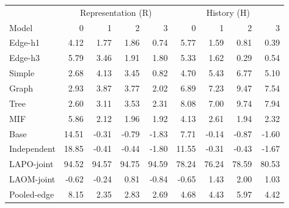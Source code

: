 \begin{tablehere}
\centering\small
\setlength{\tabcolsep}{4pt}
\caption{Observed per-agent motion readout in MPE. Skill (\%) is mean over five seeds. Columns retain each partner/agent separately; R is transition-informed representation, H is causal history. No Base concatenation.}
\label{tab:observed_changempe}
\begin{tabular}{lrrrrrrrr}\toprule
 & \multicolumn{4}{c}{Representation (R)} & \multicolumn{4}{c}{History (H)} \\
Model & 0 & 1 & 2 & 3 & 0 & 1 & 2 & 3\\\midrule
Edge-h1 & 4.12 & 1.77 & 1.86 & 0.74 & 5.77 & 1.59 & 0.81 & 0.39\\
Edge-h3 & 5.79 & 3.46 & 1.91 & 1.80 & 5.33 & 1.62 & 0.29 & 0.54\\
Simple & 2.68 & 4.13 & 3.45 & 0.82 & 4.70 & 5.43 & 6.77 & 5.10\\
Graph & 2.93 & 3.87 & 3.77 & 2.02 & 6.89 & 7.23 & 9.47 & 7.54\\
Tree & 2.60 & 3.11 & 3.53 & 2.31 & 8.08 & 7.00 & 9.74 & 7.94\\
MIF & 5.86 & 2.12 & 1.96 & 1.92 & 4.13 & 2.61 & 1.94 & 2.32\\
Base & 14.51 & -0.31 & -0.79 & -1.83 & 7.71 & -0.14 & -0.87 & -1.60\\
Independent & 18.85 & -0.41 & -0.44 & -1.80 & 11.55 & -0.31 & -0.43 & -1.67\\
LAPO-joint & 94.52 & 94.57 & 94.75 & 94.59 & 78.24 & 76.24 & 78.59 & 80.53\\
LAOM-joint & -0.62 & -0.24 & 0.81 & -0.84 & -0.65 & 1.43 & 2.00 & 1.03\\
Pooled-edge & 8.15 & 2.35 & 2.83 & 2.69 & 4.68 & 4.43 & 5.97 & 4.42\\
\bottomrule\end{tabular}
\end{tablehere}

